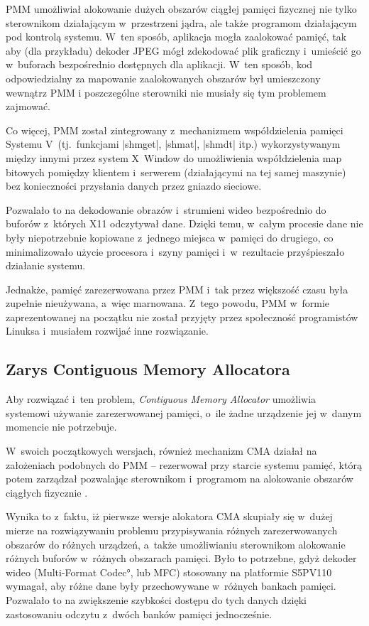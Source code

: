 PMM umożliwiał alokowanie dużych obszarów ciągłej pamięci fizycznej
nie tylko sterownikom działającym w~przestrzeni jądra, ale także
programom działającym pod kontrolą systemu.  W~ten sposób, aplikacja
mogła zaalokować pamięć, tak aby (dla przykładu) dekoder JPEG mógł
zdekodować plik graficzny i~umieścić go w~buforach bezpośrednio
dostępnych dla aplikacji.  W~ten sposób, kod odpowiedzialny za
mapowanie zaalokowanych obszarów był umieszczony wewnątrz PMM
i poszczególne sterowniki nie musiały się tym problemem zajmować.

Co więcej, PMM został zintegrowany z~mechanizmem współdzielenia
pamięci Systemu V~(tj.\ funkcjami \code|shmget|, \code|shmat|,
\code|shmdt| itp.) wykorzystywanym między innymi przez system X~Window
do umożliwienia współdzielenia map bitowych pomiędzy klientem
i~serwerem (działającymi na tej samej maszynie) bez konieczności
przysłania danych przez gniazdo sieciowe.

Pozwalało to na dekodowanie obrazów i~strumieni wideo bezpośrednio do
buforów z~których X11 odczytywał dane.  Dzięki temu, w~całym procesie
dane nie były niepotrzebnie kopiowane z~jednego miejsca w~pamięci do
drugiego, co minimalizowało użycie procesora i~szyny pamięci
i~w~rezultacie przyśpieszało działanie systemu.

Jednakże, pamięć zarezerwowana przez PMM i~tak przez większość czasu
była zupełnie nieużywana, a~więc marnowana.  Z~tego powodu, PMM
w~formie zaprezentowanej na początku nie został przyjęty przez
społeczność programistów Linuksa i~musiałem rozwijać inne rozwiązanie.

\subsection{Zarys Contiguous Memory Allocatora}

Aby rozwiązać i~ten problem, {\it Contiguous Memory Allocator}
umożliwia systemowi używanie zarezerwowanej pamięci, o~ile żadne
urządzenie jej w~danym momencie nie potrzebuje.

W~swoich początkowych wersjach, również mechanizm CMA działał na
założeniach podobnych do PMM -- rezerwował przy starcie systemu
pamięć, którą potem zarządzał pozwalając sterownikom i~programom na
alokowanie obszarów ciągłych fizycznie \autocite{patch:cma-4}.

Wynika to z~faktu, iż pierwsze wersje alokatora CMA skupiały się
w~dużej mierze na rozwiązywaniu problemu przypisywania różnych
zarezerwowanych obszarów do różnych urządzeń, a~także umożliwianiu
sterownikom alokowanie różnych buforów w~różnych obszarach pamięci.
Było to potrzebne, gdyż dekoder wideo (\ang{Multi-Format Codec}, lub
MFC) stosowany na platformie S5PV110 wymagał, aby różne dane były
przechowywane w~różnych bankach pamięci.  Pozwalało to na zwiększenie
szybkości dostępu do tych danych dzięki zastosowaniu odczytu z~dwóch
banków pamięci jednocześnie.

